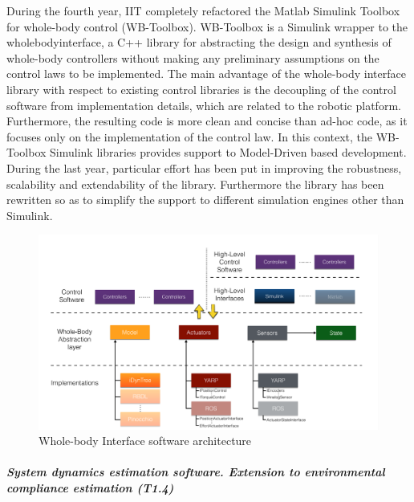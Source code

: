 During the fourth year, IIT completely refactored the Matlab Simulink Toolbox
for whole-body control (WB-Toolbox).  WB-Toolbox is a Simulink wrapper to the
wholebodyinterface, a C++ library for abstracting the design and synthesis of
whole-body controllers without making any preliminary assumptions on the
control laws to be implemented.  The main advantage of the whole-body
interface library with respect to existing control libraries is the decoupling
of the control software from implementation details, which are related to the
robotic platform.  Furthermore, the resulting code is more clean and concise
than ad-hoc code, as it focuses only on the implementation of the control law.
In this context, the WB-Toolbox Simulink libraries provides support to
Model-Driven based development.  During the last year, particular effort has
been put in improving the robustness, scalability and extendability of the
library.  Furthermore the library has been rewritten so as to simplify the
support to different simulation engines other than Simulink.
%
\begin{figure}[h]
    \centering
    \includegraphics[width=.9\textwidth]{images/WBI_diagram.pdf}
  \caption{Whole-body Interface software architecture}
  \label{fig:images_WBI_diagram}
\end{figure}
%



\subparagraph*{System dynamics estimation software. Extension to
environmental compliance estimation (T1.4)}


